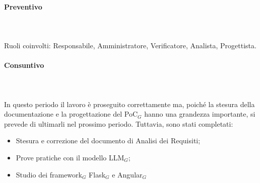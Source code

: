 \paragraph{Preventivo} \hspace{1cm} 
\\ \hspace{1cm} \\
Ruoli coinvolti: Responsabile, Amministratore, Verificatore, Analista, Progettista.
\begin{table}[H]
\centering
{}
\caption{Preventivo dell'impegno orario di ciascun membro durante il periodo III}
\end{table}

\paragraph{Consuntivo} \hspace{1cm} 
\\ \hspace{1cm} \\
In questo periodo il lavoro è proseguito correttamente ma, poiché la stesura della documentazione e la progettazione del PoC$_G$ hanno una grandezza importante, si prevede di ultimarli nel prossimo periodo. Tuttavia, sono stati completati:
\begin{itemize}
    \item Stesura e correzione del documento di Analisi dei Requisiti;
    \item Prove pratiche con il modello LLM$_G$;
    \item Studio dei framework$_G$ Flask$_G$ e Angular$_G$ 
\end{itemize}


